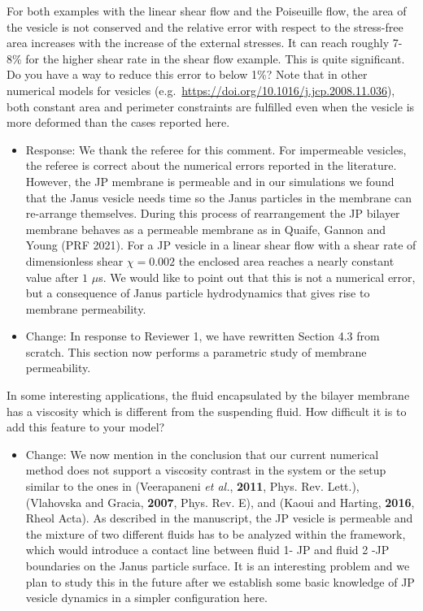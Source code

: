 \documentclass[11pt]{article}
\newcommand{\comment}[1]{{\color{blue} #1}}
\begin{document}
\noindent
\comment{For both examples with the linear shear flow and the Poiseuille
flow, the area of the vesicle is not conserved and the relative error
with respect to the stress-free area increases with the increase of the
external stresses. It can reach roughly 7-8\% for the higher shear rate
in the shear flow example. This is quite significant. Do you have a way
to reduce this error to below 1\%? Note that in other numerical models
for vesicles (e.g.~\url{https://doi.org/10.1016/j.jcp.2008.11.036}),
both constant area and perimeter constraints are fulfilled even when the
vesicle is more deformed than the cases reported here.}
\begin{itemize}
\item Response: We thank the referee for this comment. For impermeable vesicles, the referee is correct about the numerical errors reported in the literature. However, the JP membrane is permeable and in our simulations we found that the Janus vesicle needs time so the Janus particles in the membrane can re-arrange themselves. During this process of rearrangement the JP bilayer membrane behaves as a permeable membrane as in Quaife, Gannon and Young (PRF 2021). For a JP vesicle in a linear shear flow with a shear rate of dimensionless shear $\chi = 0.002$ the enclosed area reaches a nearly constant value after $1$ $\mu$s. We would like to point out that this is not a numerical error, but a consequence of Janus particle hydrodynamics that gives rise to membrane permeability.

\item Change: In response to Reviewer 1, we have rewritten Section 4.3 from scratch.
  This section now performs a parametric study of membrane permeability.
\end{itemize}

\noindent
\comment{In some interesting applications, the fluid encapsulated by the
bilayer membrane has a viscosity which is different from the suspending
fluid. How difficult it is to add this feature to your model?}
\begin{itemize}
\item Change:
  We now mention in the conclusion that our current numerical method does not support a viscosity contrast in the system 
or the setup similar to the ones in (Veerapaneni {\sl et al.}, {\bf 2011}, Phys. Rev. Lett.),
(Vlahovska and Gracia, {\bf 2007}, Phys. Rev. E), and
(Kaoui and Harting, {\bf 2016}, Rheol Acta). 
As described in the manuscript, the JP vesicle is permeable and the mixture of two different
fluids has to be analyzed within the framework, which would introduce a contact line between fluid 1- JP and fluid 2 -JP boundaries on the Janus particle surface. It is an interesting problem and we plan to study this in the future after we establish some basic knowledge of JP vesicle dynamics in a simpler configuration here.

\end{itemize}
\end{document}
